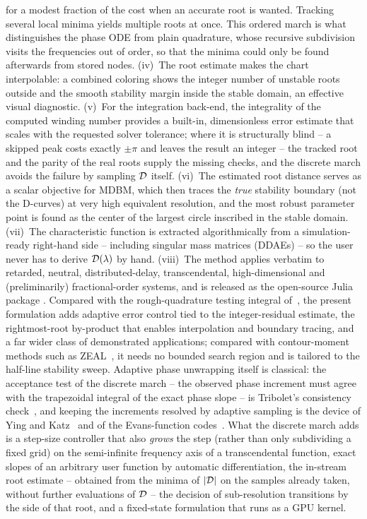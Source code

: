 for a modest fraction of the cost when an accurate root is wanted. Tracking
several local minima yields multiple roots at once. This ordered march is what
distinguishes the phase ODE from plain quadrature, whose recursive subdivision
visits the frequencies out of order, so that the minima could only be found
afterwards from stored nodes.
(iv)~The root
estimate makes the chart interpolable: a combined coloring shows the integer
number of unstable roots outside and the smooth stability margin inside the
stable domain, an effective visual diagnostic.
(v)~For the integration back-end, the integrality of the computed winding
number provides a built-in, dimensionless error estimate that scales with the
requested solver tolerance; where it is structurally blind -- a skipped peak
costs exactly $\pm\pi$ and leaves the result an integer -- the tracked root
and the parity of the real roots supply the missing checks, and the discrete
march avoids the failure by sampling $\mathcal{D}$ itself. (vi)~The estimated root
distance serves
as a scalar objective for MDBM, which then traces the \emph{true} stability
boundary (not the D-curves) at very high equivalent resolution, and the most
robust parameter point is found as the center of the largest circle inscribed
in the stable domain. (vii)~The characteristic function is extracted
algorithmically from a simulation-ready right-hand side -- including singular
mass matrices (DDAEs) -- so the user never has to derive
$\mathcal{D}(\lambda)$ by hand. (viii)~The method applies verbatim to retarded,
neutral, distributed-delay, transcendental, high-dimensional and
(preliminarily) fractional-order systems, and is released as the open-source
Julia~\cite{bezanson2017julia} package .
Compared with the rough-quadrature testing integral
of~\cite{xu2014exact,xu2016delay}, the present formulation adds adaptive
error control tied to the integer-residual estimate, the rightmost-root
by-product that enables interpolation and boundary tracing, and a far wider
class of demonstrated applications; compared with contour-moment methods such
as ZEAL~\cite{kravanja2000zeal}, it needs no bounded search region and is
tailored to the half-line stability sweep. Adaptive phase unwrapping itself
is classical: the acceptance test of the discrete march -- the observed phase
increment must agree with the trapezoidal integral of the exact phase slope --
is Tribolet's consistency check~\cite{tribolet1977new}, and keeping the
increments resolved by adaptive sampling is the device of Ying and
Katz~\cite{ying1988reliable} and of the Evans-function
codes~\cite{barker2018computing,barker2015stablab}. What the discrete march
adds is a step-size controller that also \emph{grows} the step (rather than
only subdividing a fixed grid) on the semi-infinite frequency axis of a
transcendental function, exact slopes of an arbitrary user function by
automatic differentiation, the in-stream root estimate -- obtained from the
minima of $|\mathcal{D}|$ on the samples already taken, without further evaluations
of $\mathcal{D}$ -- the decision of sub-resolution transitions by the side of that
root, and a fixed-state formulation that runs as a GPU kernel.

